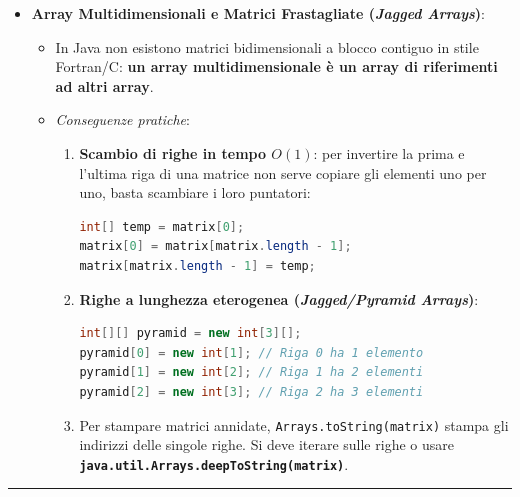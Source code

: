 \documentclass[11pt,a4paper]{article}
\newcommand{\passthrough}[1]{#1}
\providecommand{\tightlist}{\setlength{\itemsep}{0pt}\setlength{\parskip}{0pt}}
\begin{document}
\begin{itemize}
\begin{lstlisting}[language=Java]
for (String arg : args) {
    System.out.println(arg);
}
\end{lstlisting}

  Sostituisce il for contatore eliminando il rischio di errori di
  \emph{off-by-one} e \emph{ArrayIndexOutOfBoundsException}.
\item
  \textbf{Array Multidimensionali e Matrici Frastagliate (\emph{Jagged
  Arrays})}:

  \begin{itemize}
  \tightlist
  \item
    In Java non esistono matrici bidimensionali a blocco contiguo in
    stile Fortran/C: \textbf{un array multidimensionale è un array di
    riferimenti ad altri array}.
  \item
    \emph{Conseguenze pratiche}:

    \begin{enumerate}
    \def\labelenumi{\arabic{enumi}.}
    \item
      \textbf{Scambio di righe in tempo \(O(1)\)}: per invertire la
      prima e l'ultima riga di una matrice non serve copiare gli
      elementi uno per uno, basta scambiare i loro puntatori:

\begin{lstlisting}[language=Java]
int[] temp = matrix[0];
matrix[0] = matrix[matrix.length - 1];
matrix[matrix.length - 1] = temp;
\end{lstlisting}
    \item
      \textbf{Righe a lunghezza eterogenea (\emph{Jagged/Pyramid
      Arrays})}:

\begin{lstlisting}[language=Java]
int[][] pyramid = new int[3][];
pyramid[0] = new int[1]; // Riga 0 ha 1 elemento
pyramid[1] = new int[2]; // Riga 1 ha 2 elementi
pyramid[2] = new int[3]; // Riga 2 ha 3 elementi
\end{lstlisting}
    \item
      Per stampare matrici annidate,
      \passthrough{\lstinline!Arrays.toString(matrix)!} stampa gli
      indirizzi delle singole righe. Si deve iterare sulle righe o usare
      \textbf{\passthrough{\lstinline!java.util.Arrays.deepToString(matrix)!}}.
    \end{enumerate}
  \end{itemize}
\end{itemize}

\begin{center}\rule{0.5\linewidth}{0.5pt}\end{center}
\end{document}
